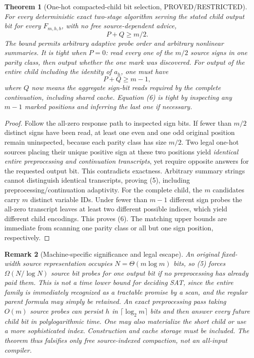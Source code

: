 \documentclass[10pt]{article}
\newtheorem{theorem}{Theorem}
\newtheorem{remark}[theorem]{Remark}
\begin{document}
\begin{theorem}[One-hot compacted-child bit selection, PROVED/RESTRICTED]
For every deterministic exact two-stage algorithm serving the stated child output bit for every $F_{m,h,b}$, with no free source-dependent advice,
\[
\boxed{P+Q\ge m/2.} \tag{5}
\]
The bound permits arbitrary adaptive probe order and arbitrary nonlinear summaries. It is tight when $P=0$: read every one of the $m/2$ source signs in one parity class, then output whether the one mark was discovered. For output of the \emph{entire child} including the identity of $a_h$, one must have
\[
\boxed{P+Q\ge m-1,} \tag{6}
\]
where $Q$ now means the aggregate sign-bit reads required by the complete continuation, including shared cache. Equation (6) is tight by inspecting any $m-1$ marked positions and inferring the last one if necessary.
\end{theorem}
\begin{proof}
Follow the all-zero response path to inspected sign bits. If fewer than $m/2$ distinct signs have been read, at least one even and one odd original position remain uninspected, because each parity class has size $m/2$. Two legal one-hot sources placing their unique positive sign at these two positions yield \emph{identical entire preprocessing and continuation transcripts}, yet require opposite answers for the requested output bit. This contradicts exactness. Arbitrary summary strings cannot distinguish identical transcripts, proving (5), including preprocessing/continuation adaptivity. For the complete child, the $m$ candidates carry $m$ distinct variable IDs. Under fewer than $m-1$ different sign probes the all-zero transcript leaves at least two different possible indices, which yield different child encodings. This proves (6). The matching upper bounds are immediate from scanning one parity class or all but one sign position, respectively.
\end{proof}

\begin{remark}[Machine-specific significance and legal escape]
An original fixed-width source representation occupies $N=\Theta(m\log m)$ bits, so (5) forces $\Omega(N/\log N)$ \emph{source bit probes} for one output bit if no preprocessing has already paid them. This is not a time lower bound for deciding SAT, since the entire family is immediately recognized as a tractable promise by a scan, and the regular parent formula may simply be retained. An exact preprocessing pass taking $O(m)$ source probes can persist $h$ in $\lceil\log_2 m\rceil$ bits and then answer every future child bit in polylogarithmic time. One may also materialize the short child or use a more sophisticated index. Construction and cache storage must be included. The theorem thus falsifies only \emph{free} source-indexed compaction, not an all-input compiler.
\end{remark}
\end{document}
